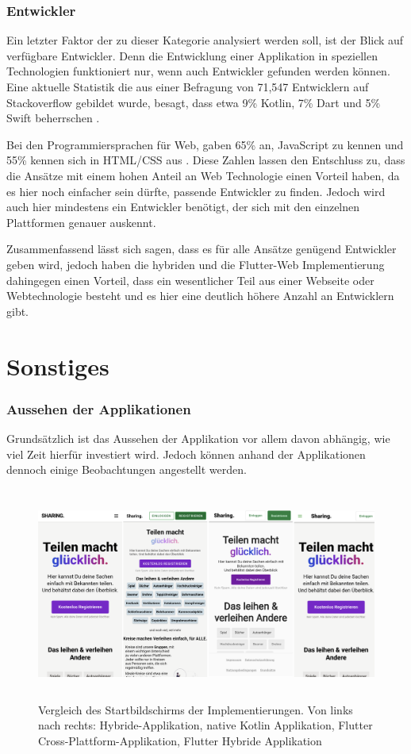 \subsubsection{Entwickler}
Ein letzter Faktor der zu dieser Kategorie analysiert werden soll, ist der Blick auf verfügbare Entwickler. Denn die Entwicklung einer Applikation in speziellen Technologien funktioniert nur, wenn auch Entwickler gefunden werden können. Eine aktuelle Statistik die aus einer Befragung von 71,547 Entwicklern auf Stackoverflow gebildet wurde, besagt, dass etwa 9\% Kotlin, 7\% Dart und 5\% Swift beherrschen \cite{statist_used_programming_languages}.

Bei den Programmiersprachen für Web, gaben  65\% an, JavaScript zu kennen und 55\% kennen sich in  HTML/CSS aus \cite{statist_used_programming_languages}. Diese Zahlen lassen den Entschluss zu, dass die Ansätze mit einem hohen Anteil an Web Technologie einen Vorteil haben, da es hier noch einfacher sein dürfte, passende Entwickler zu finden. Jedoch wird auch hier mindestens ein Entwickler benötigt, der sich mit den einzelnen Plattformen genauer auskennt.

Zusammenfassend lässt sich sagen, dass es für alle Ansätze genügend Entwickler geben wird, jedoch haben die hybriden und die Flutter-Web Implementierung dahingegen einen Vorteil, dass ein wesentlicher Teil aus einer Webseite oder Webtechnologie besteht und es hier eine deutlich höhere Anzahl an Entwicklern gibt.

\section{Sonstiges}
\subsubsection{Aussehen der Applikationen}
Grundsätzlich ist das Aussehen der Applikation vor allem davon abhängig, wie viel Zeit hierfür investiert wird. Jedoch können anhand der Applikationen dennoch einige Beobachtungen angestellt werden.

\begin{figure}[ht]
  \centering
  \includegraphics[height=7cm,keepaspectratio]{images/Startbildschirm_vergleich.png} 
  \caption[Vergleich des Startbildschirms der Implementierungen]{Vergleich des Startbildschirms der Implementierungen. Von links nach rechts: Hybride-Applikation, native Kotlin Applikation, Flutter Cross-Plattform-Applikation, Flutter Hybride Applikation}
  \label{fig:startscreen}
\end{figure}

